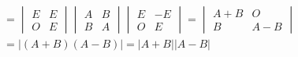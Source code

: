 \documentclass[12pt,fontset=fandol]{ctexart}
\begin{document}
\begin{solve}
\begin{align*}
                & = \begin{vmatrix}
                        E & E \\
                        O & E
                    \end{vmatrix}
                \begin{vmatrix}
                    A & B \\
                    B & A
                \end{vmatrix}
                \begin{vmatrix}
                    E & -E \\
                    O & E
                \end{vmatrix}
                = \begin{vmatrix}
                        A+B & O   \\
                        B   & A-B
                    \end{vmatrix}    \\
                & =
                \lvert (A+B)(A-B) \rvert = \lvert A+B \rvert \lvert A-B \rvert
            \end{align*}
\end{solve}
\end{document}
